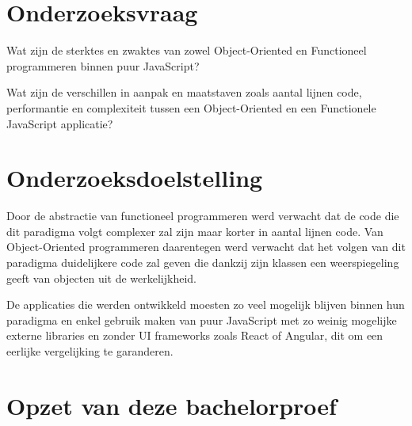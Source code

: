 \section{Onderzoeksvraag}
\label{sec:onderzoeksvraag}

Wat zijn de sterktes en zwaktes van zowel Object-Oriented en Functioneel programmeren binnen puur JavaScript?

Wat zijn de verschillen in aanpak en maatstaven zoals aantal lijnen code, performantie en complexiteit tussen een Object-Oriented en een Functionele JavaScript applicatie?

\section{Onderzoeksdoelstelling}
\label{sec:onderzoeksdoelstelling}

Door de abstractie van functioneel programmeren werd verwacht dat de code die dit paradigma volgt complexer zal zijn maar korter in aantal lijnen code. Van Object-Oriented programmeren daarentegen werd verwacht dat het volgen van dit paradigma duidelijkere code zal geven die dankzij zijn klassen een weerspiegeling geeft van objecten uit de werkelijkheid.

De applicaties die werden ontwikkeld moesten zo veel mogelijk blijven binnen hun paradigma en enkel gebruik maken van puur JavaScript met zo weinig mogelijke externe libraries en zonder UI frameworks zoals React of Angular, dit om een eerlijke vergelijking te garanderen.

\section{Opzet van deze bachelorproef}
\label{sec:opzet-bachelorproef}


